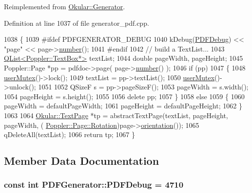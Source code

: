 Reimplemented from \hyperlink{classOkular_1_1Generator_af7915b97ab4b9347fb76babdda212cef}{Okular\+::\+Generator}.



Definition at line 1037 of file generator\+\_\+pdf.\+cpp.


\begin{DoxyCode}
1038 \{
1039 \textcolor{preprocessor}{#ifdef PDFGENERATOR\_DEBUG}
1040     kDebug(\hyperlink{classPDFGenerator_ab548883f17326b0a73d3a1b07cae0f8d}{PDFDebug}) << \textcolor{stringliteral}{"page"} << page->\hyperlink{classOkular_1_1Page_a6eee5f157a130b47d81ddd63e501664b}{number}();
1041 \textcolor{preprocessor}{#endif}
1042     \textcolor{comment}{// build a TextList...}
1043     \hyperlink{classQList}{QList<Poppler::TextBox*>} textList;
1044     \textcolor{keywordtype}{double} pageWidth, pageHeight;
1045     Poppler::Page *pp = pdfdoc->page( page->\hyperlink{classOkular_1_1Page_a6eee5f157a130b47d81ddd63e501664b}{number}() );
1046     \textcolor{keywordflow}{if} (pp)
1047     \{
1048         \hyperlink{classOkular_1_1Generator_a83d702cccbce2288c3258d97f1f15e19}{userMutex}()->lock();
1049         textList = pp->textList();
1050         \hyperlink{classOkular_1_1Generator_a83d702cccbce2288c3258d97f1f15e19}{userMutex}()->unlock();
1051 
1052         QSizeF s = pp->pageSizeF();
1053         pageWidth = s.width();
1054         pageHeight = s.height();
1055 
1056         \textcolor{keyword}{delete} pp;
1057     \}
1058     \textcolor{keywordflow}{else}
1059     \{
1060         pageWidth = defaultPageWidth;
1061         pageHeight = defaultPageHeight;
1062     \}
1063 
1064     \hyperlink{classOkular_1_1TextPage}{Okular::TextPage} *tp = abstractTextPage(textList, pageHeight, pageWidth, (
      \hyperlink{namespaceOkular_a8556d00465f61ef533c6b027669e7da6}{Poppler::Page::Rotation})page->\hyperlink{classOkular_1_1Page_ab99c3e1660eb4a87afdb093ae0daf06c}{orientation}());
1065     qDeleteAll(textList);
1066     \textcolor{keywordflow}{return} tp;
1067 \}
\end{DoxyCode}


\subsection{Member Data Documentation}
\hypertarget{classPDFGenerator_ab548883f17326b0a73d3a1b07cae0f8d}{
\subsubsection[{P\+D\+F\+Debug}]{\setlength{\rightskip}{0pt plus 5cm}const int P\+D\+F\+Generator\+::\+P\+D\+F\+Debug = 4710\hspace{0.3cm}{\ttfamily [static]}}}\label{classPDFGenerator_ab548883f17326b0a73d3a1b07cae0f8d}


